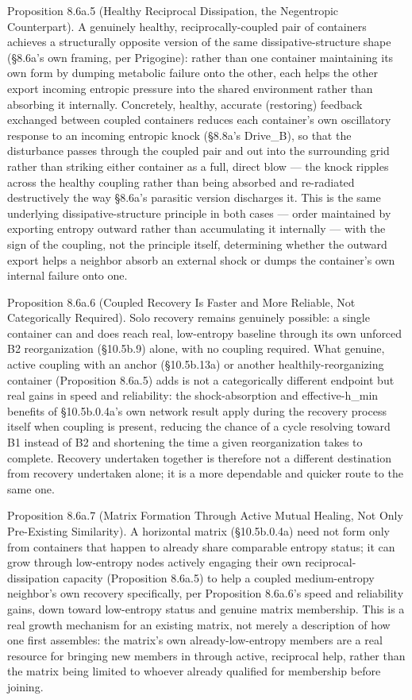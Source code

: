 \documentclass[
]{article}
\begin{document}
Proposition 8.6a.5 (Healthy Reciprocal Dissipation, the Negentropic
Counterpart). A genuinely healthy, reciprocally-coupled pair of
containers achieves a structurally opposite version of the same
dissipative-structure shape (§8.6a's own framing, per Prigogine): rather
than one container maintaining its own form by dumping metabolic failure
onto the other, each helps the other export incoming entropic pressure
into the shared environment rather than absorbing it internally.
Concretely, healthy, accurate (restoring) feedback exchanged between
coupled containers reduces each container's own oscillatory response to
an incoming entropic knock (§8.8a's Drive\_B), so that the disturbance
passes through the coupled pair and out into the surrounding grid rather
than striking either container as a full, direct blow --- the knock
ripples across the healthy coupling rather than being absorbed and
re-radiated destructively the way §8.6a's parasitic version discharges
it. This is the same underlying dissipative-structure principle in both
cases --- order maintained by exporting entropy outward rather than
accumulating it internally --- with the sign of the coupling, not the
principle itself, determining whether the outward export helps a
neighbor absorb an external shock or dumps the container's own internal
failure onto one.

Proposition 8.6a.6 (Coupled Recovery Is Faster and More Reliable, Not
Categorically Required). Solo recovery remains genuinely possible: a
single container can and does reach real, low-entropy baseline through
its own unforced B2 reorganization (§10.5b.9) alone, with no coupling
required. What genuine, active coupling with an anchor (§10.5b.13a) or
another healthily-reorganizing container (Proposition 8.6a.5) adds is
not a categorically different endpoint but real gains in speed and
reliability: the shock-absorption and effective-h\_min benefits of
§10.5b.0.4a's own network result apply during the recovery process
itself when coupling is present, reducing the chance of a cycle
resolving toward B1 instead of B2 and shortening the time a given
reorganization takes to complete. Recovery undertaken together is
therefore not a different destination from recovery undertaken alone; it
is a more dependable and quicker route to the same one.

Proposition 8.6a.7 (Matrix Formation Through Active Mutual Healing, Not
Only Pre-Existing Similarity). A horizontal matrix (§10.5b.0.4a) need
not form only from containers that happen to already share comparable
entropy status; it can grow through low-entropy nodes actively engaging
their own reciprocal-dissipation capacity (Proposition 8.6a.5) to help a
coupled medium-entropy neighbor's own recovery specifically, per
Proposition 8.6a.6's speed and reliability gains, down toward
low-entropy status and genuine matrix membership. This is a real growth
mechanism for an existing matrix, not merely a description of how one
first assembles: the matrix's own already-low-entropy members are a real
resource for bringing new members in through active, reciprocal help,
rather than the matrix being limited to whoever already qualified for
membership before joining.
\end{document}
